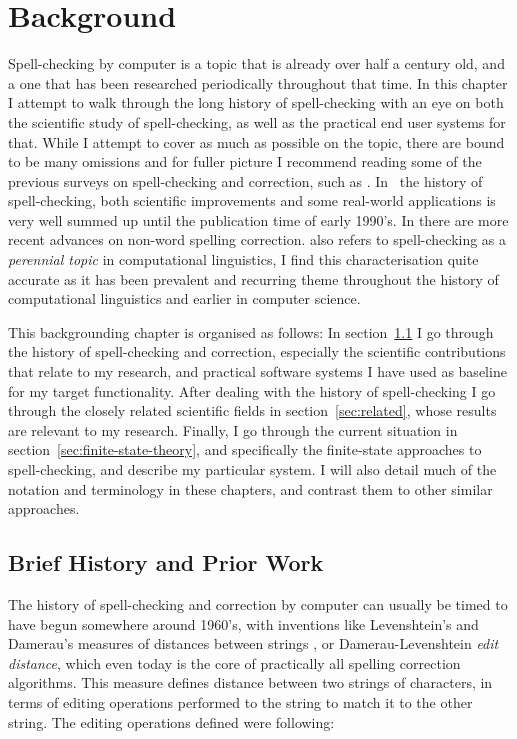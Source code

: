 \documentclass[officiallayout]{unihelcompling}
\begin{document}
\chapter{Background}
\label{chap:background}

Spell-checking by computer is a topic that is already over half a century old,
and a one that has been researched periodically throughout that time.  In this
chapter I attempt to walk through the long history of spell-checking with an
eye on both the scientific study of spell-checking, as well as the practical
end user systems for that. While I attempt to cover as much as possible on the
topic, there are bound to be many omissions and for fuller picture I recommend
reading some of the previous surveys on spell-checking and correction, such as
\citet{kukich1992spelling,mitton2009ordering}.  In~\citet{kukich1992spelling}
the history of spell-checking, both scientific improvements and some real-world
applications is very well summed up until the publication time of early 1990's.
In \citet{mitton2009ordering} there are more recent advances on non-word
spelling correction.  \citet{kukich1992spelling} also refers to spell-checking
as a \emph{perennial topic} in computational linguistics, I find this
characterisation quite accurate as it has been prevalent and recurring theme
throughout the history of computational linguistics and earlier in
computer science.

This backgrounding chapter is organised as follows: In
section~\ref{sec:history} I go through the history of spell-checking and
correction, especially the scientific contributions that relate to my research,
and practical software systems I have used as baseline for my target
functionality.  After dealing with the history of spell-checking I go through
the closely related scientific fields in section~\ref{sec:related}, whose
results are relevant to my research. Finally, I go through the current
situation in section~\ref{sec:finite-state-theory}, and specifically the
finite-state approaches to spell-checking, and describe my particular system. I
will also detail much of the notation and terminology in these chapters, and
contrast them to other similar approaches.

\section{Brief History and Prior Work}
\label{sec:history}

The history of spell-checking and correction by computer can usually be timed
to have begun somewhere around 1960's, with inventions like Levenshtein's and
Damerau's measures of distances between strings
\citep{levenshtein1966binary,damerau1964technique}, or Damerau-Levenshtein
\emph{edit distance}, which even today is the core of practically all spelling
correction algorithms. This measure defines distance between two strings of
characters, in terms of editing operations performed to the string to match it
to the other string. The editing operations defined were following:
\end{document}
